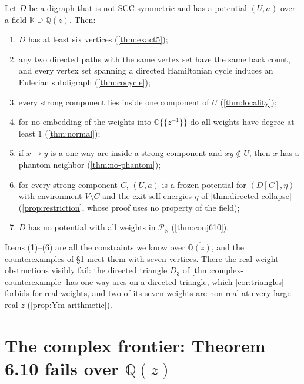 \documentclass[final]{siamart0516}
\numberwithin{theorem}{section}
\numberwithin{equation}{section}
\theoremstyle{siamnonum}
\theoremstyle{plain}
\newcommand{\QQ}{\mathbb{Q}}
\newcommand{\RR}{\mathbb{R}}
\newcommand{\CC}{\mathbb{C}}
\newcommand{\Qz}{\QQ(z)}
\newcommand{\Qzbar}{\overline{\QQ(z)}}
\newcommand{\Puis}{\mathcal{P}_{\RR}}
\begin{document}
\begin{proposition}\label{prop:shape}
Let $D$ be a digraph that is not SCC-symmetric and has a potential $(U,a)$ over a field $\mathbb K\supseteq\Qz$. Then:
\begin{enumerate}[label=\textup{(\arabic*)}]
\item $D$ has at least six vertices \textup{(\cref{thm:exact5})};
\item any two directed paths with the same vertex set have the same back count, and every vertex set spanning a directed Hamiltonian cycle induces an Eulerian subdigraph \textup{(\cref{thm:cocycle})};
\item every strong component lies inside one component of $U$ \textup{(\cref{thm:locality})};
\item for no embedding of the weights into $\CC\{\!\{z^{-1}\}\!\}$ do all weights have degree at least $1$ \textup{(\cref{thm:normal})};
\item if $x\to y$ is a one-way arc inside a strong component and $xy\notin U$, then $x$ has a phantom neighbor \textup{(\cref{thm:no-phantom})};
\item for every strong component $C$, $(U,a)$ is a frozen potential for $(D[C],\eta)$ with environment $V\setminus C$ and the exit self-energies $\eta$ of \cref{thm:directed-collapse} \textup{(\cref{prop:restriction}, whose proof uses no property of the field)};
\item $D$ has no potential with all weights in $\Puis$ \textup{(\cref{thm:conj610})}.
\end{enumerate}
\end{proposition}

Items (1)--(6) are all the constraints we know over $\Qzbar$, and the counterexamples of \S\ref{sec:complex} meet them with seven vertices. There the real-weight obstructions visibly fail: the directed triangle $D_3$ of \cref{thm:complex-counterexample} has one-way arcs on a directed triangle, which \cref{cor:triangles} forbids for real weights, and two of its seven weights are non-real at every large real $z$ (\cref{prop:Ym-arithmetic}).

\section{The complex frontier: Theorem 6.10 fails over \texorpdfstring{$\Qzbar$}{the algebraic closure}}\label{sec:complex}
\end{document}
